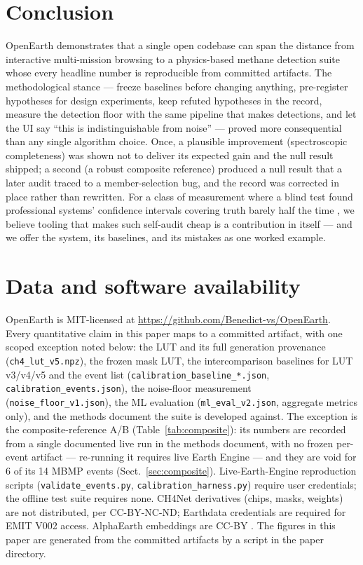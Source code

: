 \documentclass[11pt]{article}
\newcommand{\code}[1]{\texttt{\small #1}}
\begin{document}
\section{Conclusion}\label{sec:conclusion}

OpenEarth demonstrates that a single open codebase can span the distance
from interactive multi-mission browsing to a physics-based methane
detection suite whose every headline number is reproducible from committed
artifacts. The methodological stance --- freeze baselines before changing
anything, pre-register hypotheses for design experiments, keep refuted
hypotheses in the record, measure the detection floor with the same
pipeline that makes detections, and let the UI say ``this is
indistinguishable from noise'' --- proved more consequential than any
single algorithm choice. Once, a plausible improvement (spectroscopic
completeness) was shown not to deliver its expected gain and the null
result shipped; a second (a robust composite reference) produced a null
result that a later audit traced to a member-selection bug, and the record
was corrected in place rather than rewritten. For a class of
measurement where a blind test found professional systems' confidence
intervals covering truth barely half the time \citep{sherwin2024}, we
believe tooling that makes such self-audit cheap is a contribution in
itself --- and we offer the system, its baselines, and its mistakes as one
worked example.

\section*{Data and software availability}

OpenEarth is MIT-licensed at
\url{https://github.com/Benedict-vs/OpenEarth}. Every quantitative claim
in this paper maps to a committed artifact, with one scoped exception
noted below: the LUT and its full
generation provenance (\code{ch4\_lut\_v5.npz}), the frozen mask LUT, the
intercomparison baselines for LUT v3/v4/v5 and the event list
(\code{calibration\_baseline\_*.json}, \code{calibration\_events.json}), the
noise-floor measurement (\code{noise\_floor\_v1.json}), the ML evaluation
(\code{ml\_eval\_v2.json}, aggregate metrics only), and the methods
document the suite is developed against. The exception is the
composite-reference A/B (Table~\ref{tab:composite}): its numbers are
recorded from a single documented live run in the methods document, with
no frozen per-event artifact --- re-running it requires live Earth
Engine --- and they are void for 6 of its 14 MBMP events
(Sect.~\ref{sec:composite}). Live-Earth-Engine reproduction
scripts (\code{validate\_events.py}, \code{calibration\_harness.py})
require user credentials; the offline test suite requires none. CH4Net
derivatives (chips, masks, weights) are not distributed, per
CC-BY-NC-ND; Earthdata credentials are required for EMIT V002 access.
AlphaEarth embeddings are CC-BY \citep{brown2025alphaearth}. The figures
in this paper are generated from the committed artifacts by a script in
the paper directory.
\end{document}
